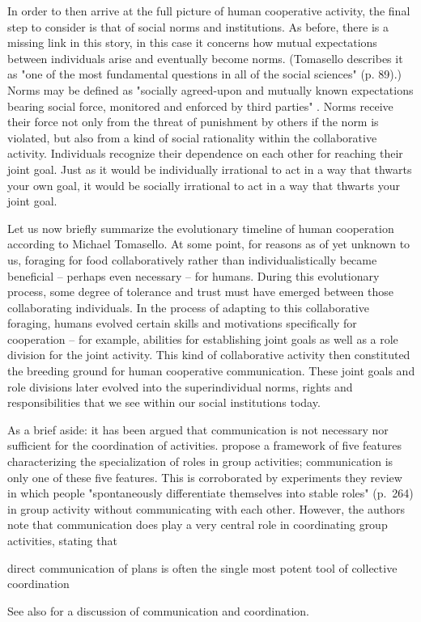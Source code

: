 In order to then arrive at the full picture of human cooperative activity, the final step to consider is that of social norms and institutions. As before, there is a missing link in this story, in this case it concerns how mutual expectations between individuals arise and eventually become norms. (Tomasello describes it as "one of the most fundamental questions in all of the social sciences" (p. 89).)
Norms may be defined as "socially agreed-upon and mutually known expectations bearing social force, monitored and enforced by third parties" \citep[p.~87]{Tomasello09}. Norms receive their force not only from the threat of punishment by others if the norm is violated, but also from a kind of social rationality within the collaborative activity. Individuals recognize their dependence on each other for reaching their joint goal. Just as it would be individually irrational to act in a way that thwarts your own goal, it would be socially irrational to act in a way that thwarts your joint goal.

Let us now briefly summarize the evolutionary timeline of human cooperation according to Michael Tomasello.
At some point, for reasons as of yet unknown to us, foraging for food collaboratively rather than individualistically became beneficial -- perhaps even necessary -- for humans.
During this evolutionary process, some degree of tolerance and trust must have emerged between those collaborating individuals.
In the process of adapting to this collaborative foraging, humans evolved certain skills and motivations specifically for cooperation -- for example, abilities for establishing joint goals as well as a role division for the joint activity.
This kind of collaborative activity then constituted the breeding ground for human cooperative communication.
These joint goals and role divisions later evolved into the superindividual norms, rights and responsibilities that we see within our social institutions today.

As a brief aside: it has been argued that communication is not necessary nor sufficient for the coordination of activities. \citet{Goldstone24} propose a framework of five features characterizing the specialization of roles in group activities; communication is only one of these five features. This is corroborated by experiments they review in which people "spontaneously differentiate themselves into stable roles" (p.~264) in group activity without communicating with each other.
However, the authors note that communication does play a very central role in coordinating group activities, stating that
\begin{quoting}
    direct communication of plans is often the single most potent tool of collective coordination
    \hfill \citep[p.~276]{Goldstone24}
\end{quoting}
See also \citet{Vorobeychik17} for a discussion of communication and coordination.

